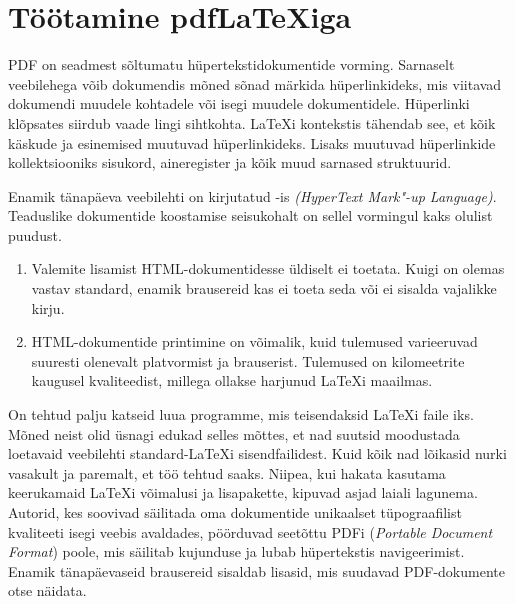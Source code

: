 
\section{Töötamine pdf\LaTeX iga} \label{sec:pdftex}
%
PDF on seadmest sõltumatu hüpertekstidokumentide vorming. Sarnaselt
veebilehega võib dokumendis mõned sõnad märkida
hüperlinkideks, mis viitavad dokumendi muudele
kohtadele või isegi muudele dokumentidele. Hüperlinki klõpsates siirdub
vaade lingi sihtkohta. \LaTeX i kontekstis tähendab see, et kõik käskude
 ja  esinemised muutuvad hüperlinkideks. Lisaks
muutuvad hüperlinkide kollektsiooniks sisukord, aineregister ja kõik
muud sarnased struktuurid.

Enamik tänapäeva veebilehti on kirjutatud -is \emph{(HyperText
Mark"-up Language)}. Teaduslike dokumentide koostamise seisukohalt on
sellel vormingul kaks olulist puudust.
\begin{enumerate}
  \item Valemite lisamist HTML-dokumentidesse üldiselt ei toetata. Kuigi
on olemas vastav standard, enamik brausereid kas ei toeta seda või ei
sisalda vajalikke kirju.
  \item HTML-dokumentide printimine on võimalik, kuid tulemused
varieeruvad suuresti olenevalt platvormist ja brauserist. Tulemused
on kilomeetrite kaugusel kvaliteedist, millega ollakse harjunud \LaTeX i
maailmas.
\end{enumerate}

On tehtud palju katseid luua programme, mis teisendaksid \LaTeX i faile
iks. Mõned neist olid üsnagi edukad selles mõttes, et nad
suutsid moodustada loetavaid veebilehti standard-\LaTeX i
sisendfailidest. Kuid kõik nad lõikasid nurki vasakult ja paremalt, et
töö tehtud saaks. Niipea, kui hakata kasutama keerukamaid \LaTeX i
võimalusi ja lisapakette, kipuvad asjad laiali lagunema. Autorid, kes
soovivad säilitada oma dokumentide unikaalset tüpograafilist kvaliteeti
isegi veebis avaldades, pöörduvad seetõttu PDFi (\emph{Portable Document
Format}) poole, mis säilitab kujunduse ja lubab hüpertekstis
navigeerimist. Enamik tänapäevaseid brausereid sisaldab lisasid, mis
suudavad PDF-dokumente otse näidata.

